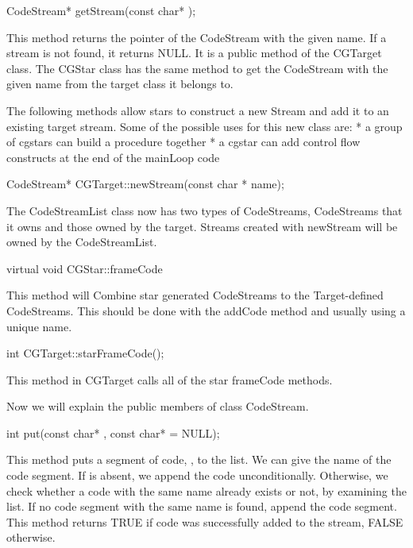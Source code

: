 \begin{example}
CodeStream* getStream(const char* );
\end{example}

This method returns the pointer of the CodeStream with the given name. If
a stream is not found, it returns NULL. It is a public method of the 
CGTarget class. The CGStar class has the same method to get the
CodeStream with the given name from the target class it belongs to.

The following methods allow stars to construct a new Stream and add it to
an existing target stream.  Some of the possible uses for this new class are:
* a group of cgstars can build a procedure together
* a cgstar can add control flow constructs at the end of the mainLoop code

\begin{example}
CodeStream* CGTarget::newStream(const char * name);
\end{example}

The CodeStreamList class now has two types of CodeStreams, CodeStreams that
it owns and those owned by the target.  Streams created with newStream
will be owned by the CodeStreamList.

\begin{example}
virtual void CGStar::frameCode
\end{example}

This method will Combine star generated CodeStreams to the Target-defined
CodeStreams.  This should be done with the addCode method and usually using
a unique name.

\begin{example}
int CGTarget::starFrameCode();
\end{example}

This method in CGTarget calls all of the star frameCode methods.

Now we will explain the public members of class CodeStream.

\begin{example}
int put(const char* , const char*  = NULL);
\end{example}

This method puts a segment of code, , to the list. We can give
the name of the code segment. If  is absent, we append the code
unconditionally. Otherwise, we check whether a code with the same name
already exists or not, by examining the  list. If no
code segment with the same name is found, append the code segment. This
method returns TRUE if code was successfully added to the stream, FALSE
otherwise.

